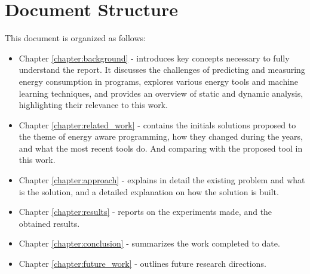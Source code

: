 \section{Document Structure}

This document is organized as follows:

\begin{itemize}
\item Chapter \ref{chapter:background} - introduces key concepts necessary to fully understand the report. It discusses the challenges of predicting and measuring energy consumption in programs, explores various energy tools and machine learning techniques, and provides an overview of static and dynamic analysis, highlighting their relevance to this work.

\item Chapter \ref{chapter:related_work} - contains the initials solutions proposed to the theme of energy aware programming, how they changed during the years, and what the most recent tools do. And comparing with the proposed tool in this work.

\item Chapter \ref{chapter:approach} - explains in detail the existing problem and what is the solution, and a detailed explanation on how the solution is built.

\item Chapter \ref{chapter:results} - reports on the experiments made, and the obtained results.

\item Chapter \ref{chapter:conclusion} - summarizes the work completed to date.

\item Chapter \ref{chapter:future_work} - outlines future research directions.

\end{itemize}
